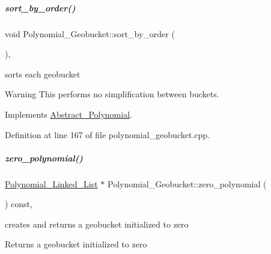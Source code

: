 \mbox{\label{group__polygroup_ad3c705cb5c03be2ed62fea65101d1195}} 
\subparagraph{\texorpdfstring{sort\+\_\+by\+\_\+order()}{sort\_by\_order()}}
{\footnotesize\ttfamily void Polynomial\+\_\+\+Geobucket\+::sort\+\_\+by\+\_\+order (\begin{DoxyParamCaption}{ }\end{DoxyParamCaption})\hspace{0.3cm}{\ttfamily [override]}, {\ttfamily [virtual]}}



sorts each geobucket 

\begin{DoxyWarning}{Warning}
This performs no simplification between buckets. 
\end{DoxyWarning}


Implements \hyperlink{group__polygroup_a1fcdd29c324c660ea935197c39e682f2}{Abstract\+\_\+\+Polynomial}.



Definition at line 167 of file polynomial\+\_\+geobucket.\+cpp.

\mbox{\label{group__polygroup_a7723d297ad268bb7139b1592f4e2eaff}} 
\subparagraph{\texorpdfstring{zero\+\_\+polynomial()}{zero\_polynomial()}}
{\footnotesize\ttfamily \hyperlink{group__polygroup_class_polynomial___linked___list}{Polynomial\+\_\+\+Linked\+\_\+\+List} $\ast$ Polynomial\+\_\+\+Geobucket\+::zero\+\_\+polynomial (\begin{DoxyParamCaption}{ }\end{DoxyParamCaption}) const\hspace{0.3cm}{\ttfamily [override]}, {\ttfamily [virtual]}}



creates and returns a geobucket initialized to zero 

\begin{DoxyReturn}{Returns}
a geobucket initialized to zero 
\end{DoxyReturn}


